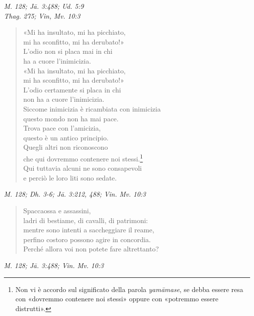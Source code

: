 \emph{M. 128; Jā. 3:488; Ud. 5:9} \\
\emph{Thag. 275; Vin, Mv. 10:3}


\begin{quote}
«Mi ha insultato, mi ha picchiato, \\
mi ha sconfitto, mi ha derubato!» \\
L’odio non si placa mai in chi \\
ha a cuore l’inimicizia. \\
«Mi ha insultato, mi ha picchiato, \\
mi ha sconfitto, mi ha derubato!» \\
L’odio certamente si placa in chi \\
non ha a cuore l’inimicizia. \\
Siccome inimicizia è ricambiata con inimicizia \\
questo mondo non ha mai pace. \\
Trova pace con l’amicizia, \\
questo è un antico principio. \\
Quegli altri non riconoscono \\
che qui dovremmo contenere noi stessi.\footnote{Non vi è accordo sul significato della parola \emph{yamāmase}, se debba essere resa con «dovremmo contenere noi stessi» oppure con «potremmo essere distrutti».} \\
Qui tuttavia alcuni ne sono consapevoli \\
e perciò le loro liti sono sedate.
\end{quote}

\emph{M. 128; Dh. 3-6; Jā. 3:212, 488; Vin. Mv. 10:3}


\begin{quote}
Spaccaossa e assassini, \\
ladri di bestiame, di cavalli, di patrimoni: \\
mentre sono intenti a saccheggiare il reame, \\
perfino costoro possono agire in concordia. \\
Perché allora voi non potete fare altrettanto?
\end{quote}

\emph{M. 128; Jā. 3:488; Vin. Mv. 10:3}


